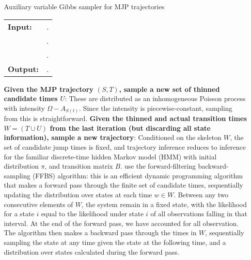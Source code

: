 \begin{algorithm}[H]
  \caption{Auxiliary variable Gibbs sampler for MJP trajectories~\cite{RaoTeh13} }
   \label{alg:Unif_gibbs}
  \begin{tabular}{l l}
   \textbf{Input:  } & \text{MJP parameters $\theta$; a set of partial and noisy observations $X$}. \\
                     & \text{A  parameter $\Omega > \max_i A_s$}.\\
                      & \text{The previous MJP path $S(t) = (S, T)$}.\\ 
   \textbf{Output:  }& \text{A new MJP trajectory $\tilde{S} (t) = (\tilde{S}, \tilde{T})$}.\\
   \hline
   \end{tabular}
   \begin{algorithmic}[1]
\State \textbf{Given the MJP trajectory $(S,T)$, sample a new set of thinned 
candidate times $U$}: %
These are distributed as an inhomogeneous Poisson process with intensity 
$\Omega-A_{S(t)}$. Since the intensity is piecewise-constant, sampling from this 
is straightforward.
\State \textbf{Given the thinned and actual transition times $W = (T \cup U)$
from the last iteration (but discarding all state information), 
sample a new trajectory}:
    Conditioned on the skeleton $W$, the set of candidate jump
    times is fixed, and trajectory inference reduces to inference for
    the familiar discrete-time hidden Markov model (HMM) with initial distribution
    $\pi$, and transition matrix $B$. \cite{RaoTeh13} use the forward-filtering
    backward-sampling (FFBS) algorithm: this is an efficient dynamic 
    programming algorithm that makes a forward pass through the
    finite set of candidate times, sequentially updating the 
    distribution over states at each time $w \in W$. 
    Between any two consecutive elements of $W$,
    the system remain in a fixed state, with the likelihood for a state $i$ equal
    to the likelihood under state $i$ of all observations 
    falling in that interval. 
    At the end of the forward pass, we have accounted for all observation.
    The algorithm then makes a backward pass through the times in $W$, 
    sequentially sampling the state at any time given the state at the 
    following time, and a distribution over states calculated during the
    forward pass. 
\end{algorithmic}
\end{algorithm}

